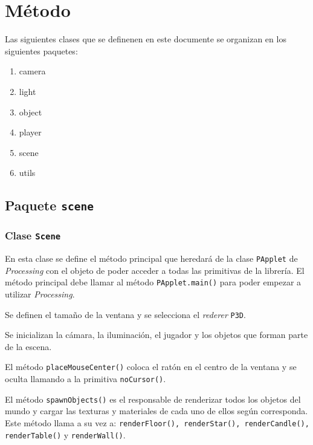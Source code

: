 \documentclass[10pt,a4paper]{report}
\begin{document}
	\section{Método}
	Las siguientes clases que se definenen en este documente se organizan en los siguientes paquetes:
	\begin{enumerate}
		\item camera
		\item light
		\item object
		\item player
		\item scene
		\item utils
	\end{enumerate}
	
	\subsection{Paquete \texttt{scene}}
	\subsubsection{Clase \texttt{Scene}}\label{class:scene}
	En esta clase se define el método principal que heredará de la clase \texttt{PApplet} de \textit{Processing} con el objeto de poder acceder a todas las primitivas de la librería. El método principal debe llamar al método \texttt{PApplet.main()} para poder empezar a utilizar \textit{Processing}.
	
	
	
	Se definen el tamaño de la ventana y se selecciona el \textit{rederer} \texttt{P3D}.
	
	
	
	Se inicializan la cámara, la iluminación, el jugador y los objetos que forman parte de la escena. 
	
	
	
	El método \texttt{placeMouseCenter()} coloca el ratón en el centro de la ventana y se oculta llamando a la primitiva \texttt{noCursor()}.
	
	
	
	El método \texttt{spawnObjects()} es el responsable de renderizar todos los objetos del mundo y cargar las texturas y materiales de cada uno de ellos según corresponda. Este método llama a su vez a: \texttt{renderFloor(), renderStar(), renderCandle(), renderTable()} y \texttt{renderWall()}.
	
\end{document}
